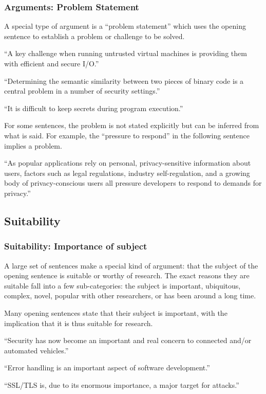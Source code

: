 \documentclass[sigconf]{acmart}
\begin{document}
	\subsubsection{Arguments: Problem Statement }
	
	A special type of argument is a “problem statement” which uses the opening sentence to establish a problem or challenge to be solved. 
	
	``A key challenge when running untrusted virtual machines is providing them with efficient and secure I/O.''
	
	``Determining the semantic similarity between two pieces of binary code is a central problem in a number of security settings.''
	
	``It is difficult to keep secrets during program execution.''
	
	For some sentences, the problem is not stated explicitly but can be inferred from what is said. For example, the “pressure to respond” in the following sentence implies a problem.
	
	``As popular applications rely on personal, privacy-sensitive information about users, factors such as legal regulations, industry self-regulation, and a growing body of privacy-conscious users all pressure developers to respond to demands for privacy.''
	
	\subsection{Suitability}
	\subsubsection{Suitability: Importance of subject}
	
	A large set of sentences make a special kind of argument: that the subject of the opening sentence is suitable or worthy of research. The exact reasons they are suitable fall into a few sub-categories: the subject is important, ubiquitous, complex, novel, popular with other researchers, or has been around a long time. 
	
	Many opening sentences state that their subject is important, with the implication that it is thus suitable for research.
	
	``Security has now become an important and real concern to connected and/or automated vehicles.''
	
	``Error handling is an important aspect of software development.''
	
	``SSL/TLS is, due to its enormous importance, a major target for attacks.''
	
\end{document}

